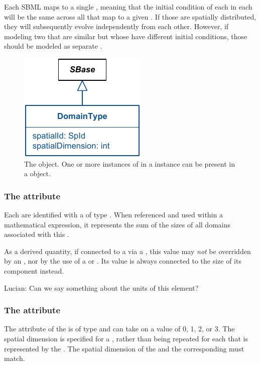 Each SBML \Compartment maps to a single \DomainType, meaning that the initial condition of each \Species in each \Compartment will be the same across all \Domains that map to a given \DomainType.  If those \Species are spatially distributed, they will subsequently evolve independently from each other.  However, if modeling two \Domains that are similar but whose \Species have different initial conditions, those \Domains should be modeled as separate \DomainTypes.

\begin{figure}[ht]
  \includegraphics{figs/DomainType-uml}
  \caption{The \DomainType object. One or more instances of \DomainType in a \ListOfDomainTypes instance can be present in a \Geometry object.}
  \label{DomainType-uml}
\end{figure}

\subsubsection{The  attribute}
Each \DomainType are identified with a  of type .  When referenced and used within a mathematical expression, it represents the sum of the sizes of all domains associated with this \DomainType.

As a derived quantity, if connected to a \Parameter via a \SpatialSymbolReference, this value may \emph{not} be overridden by an \InitialAssignment, nor by the use of a \Rule or \Event.  Its value is always connected to the size of its component \Domains instead.

{\color{red} Lucian: \notice Can we say something about the units of this element?}

\subsubsection{The  attribute}
The  attribute of the \DomainType is of type  and can take on a value of 0, 1, 2, or 3. The spatial dimension is specified for a \DomainType, rather than being repeated for each \Domain that is represented by the \DomainType.  The spatial dimension of the \Domains and the corresponding \DomainType must match.

